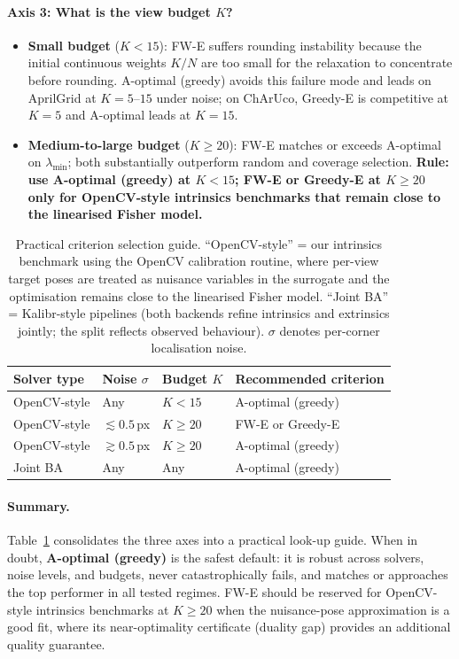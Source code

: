 \documentclass[letterpaper, 9
 pt, conference]{ieeeconf}
\begin{document}
\paragraph{Axis 3: What is the view budget $K$?}
\begin{itemize}[leftmargin=1.5em]
  \item \textbf{Small budget} ($K{<}15$): FW-E suffers rounding instability
  because the initial continuous weights $K/N$ are too small for the relaxation
  to concentrate before rounding.
  A-optimal (greedy) avoids this failure mode and leads on AprilGrid at
  $K{=}5$--$15$ under noise; on ChArUco, Greedy-E is competitive at $K{=}5$
  and A-optimal leads at $K{=}15$.
  \item \textbf{Medium-to-large budget} ($K{\ge}20$): FW-E matches or exceeds
  A-optimal on $\lambda_{\min}$; both substantially outperform random and
  coverage selection.
  \textbf{Rule: use A-optimal (greedy) at $K{<}15$; FW-E or Greedy-E at
  $K{\ge}20$ only for OpenCV-style intrinsics benchmarks that remain close to
  the linearised Fisher model.}
\end{itemize}

\begin{table}[ht]
\centering
\caption{Practical criterion selection guide.
``OpenCV-style'' = our intrinsics benchmark using the OpenCV calibration routine,
where per-view target poses are treated as nuisance variables in the surrogate
and the optimisation remains close to the linearised Fisher model.
``Joint BA'' = Kalibr-style pipelines (both backends refine intrinsics
and extrinsics jointly; the split reflects observed behaviour). $\sigma$ denotes per-corner localisation noise.}
\label{tab:criterion_guide}
\scriptsize
\setlength{\tabcolsep}{5pt}
\begin{tabular}{llll}
\toprule
Solver type & Noise $\sigma$ & Budget $K$ & Recommended criterion \\
\midrule
OpenCV-style & Any         & $K < 15$    & A-optimal (greedy) \\
OpenCV-style & $\lesssim 0.5$\,px & $K \ge 20$ & FW-E or Greedy-E \\
OpenCV-style & $\gtrsim 0.5$\,px & $K \ge 20$ & A-optimal (greedy) \\
Joint BA     & Any         & Any         & A-optimal (greedy) \\
\bottomrule
\end{tabular}
\end{table}

\paragraph{Summary.}
Table~\ref{tab:criterion_guide} consolidates the three axes into a practical
look-up guide.
When in doubt, \textbf{A-optimal (greedy)} is the safest default: it is
robust across solvers, noise levels, and budgets, never catastrophically
fails, and matches or approaches the top performer in all tested regimes.
FW-E should be reserved for OpenCV-style intrinsics benchmarks at $K{\ge}20$
when the nuisance-pose approximation is a good fit, where its near-optimality
certificate (duality gap) provides an additional quality guarantee.
\end{document}
